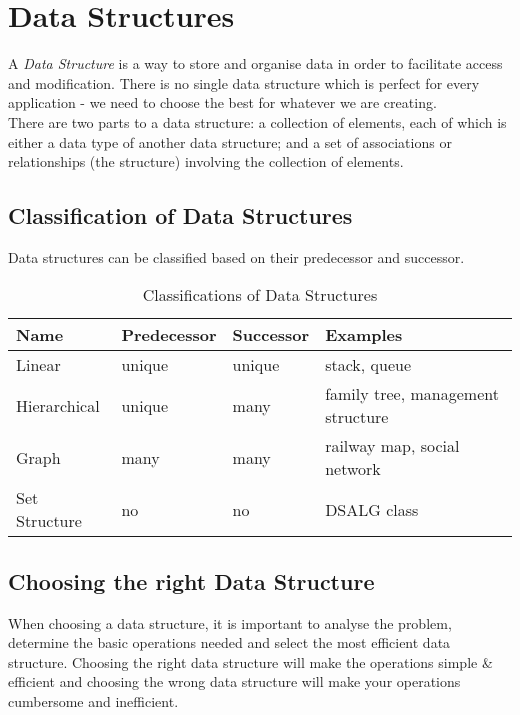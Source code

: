 
\section{Data Structures}
A \textit{Data Structure} is a way to store and organise data in order to facilitate access and modification. There is no single data structure which is perfect for every application - we need to choose the best for whatever we are creating. \\

There are two parts to a data structure: a collection of elements, each of which is either a data type of another data structure; and a set of associations or relationships (the structure) involving the collection of elements.

\subsection{Classification of Data Structures}
Data structures can be classified based on their predecessor and successor.

\begin{table}[H]
    \centering
    {\RaggedRight
    \begin{tabular}{p{} p{} p{} p{}}
    \textbf{Name} & \textbf{Predecessor} & \textbf{Successor} & \textbf{Examples}\\
    \hline
    \hline
    Linear & unique & unique & stack, queue\\
    \hline
    Hierarchical & unique & many & family tree, management structure\\
    \hline
    Graph & many & many & railway map, social network\\
    \hline
    Set Structure & no & no & DSALG class\\
    \hline
    \end{tabular}
    } %
    \caption{Classifications of Data Structures}
    \end{table}

\subsection{Choosing the right Data Structure}
When choosing a data structure, it is important to analyse the problem, determine the basic operations needed and select the most efficient data structure. Choosing the right data structure will make the operations simple \& efficient and choosing the wrong data structure will make your operations cumbersome and inefficient.

